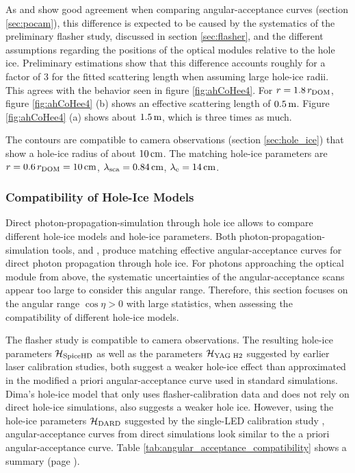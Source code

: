 As \clsim and \ppc show good agreement when comparing angular-acceptance
curves (section \ref{sec:pocam}), this difference is expected to be
caused by the systematics of the preliminary flasher study, discussed in
section \ref{sec:flasher}, and the different assumptions regarding the
positions of the optical modules relative to the hole ice. Preliminary
estimations show that this difference accounts roughly for a factor of
\(3\) for the fitted scattering length when assuming large hole-ice
radii. This agrees with the behavior seen in figure \ref{fig:ahCoHee4}.
For \(r=1.8\,r_\text{DOM}\), figure \ref{fig:ahCoHee4} (b) shows an effective
scattering length of \(0.5\text{\,m}\). Figure \ref{fig:ahCoHee4} (a) shows
about \(1.5\text{\,m}\), which is three times as much.

The  contours are compatible to camera observations
(section \ref{sec:hole_ice}) that show a hole-ice radius of about
\(10\text{\,cm}\). \cite{rongenswedishcamera} The matching 
hole-ice parameters are \(r = 0.6\,r_\text{DOM} = 10\text{\,cm}\),
\(\lambda_\text{sca} = 0.84\text{\,cm}\), \(\lambda_\text{e} = 14\text{\,cm}\).
\cite{martinspicehddard}

\subsubsection{Compatibility of Hole-Ice Models}
\label{sec:compatibility_of_hole_ice_parameters}

Direct photon-propagation-simulation through hole ice allows to compare
different hole-ice models and hole-ice parameters. Both
photon-propagation-simulation tools, \ppc and \clsim, produce matching
effective angular-acceptance curves for direct photon propagation
through hole ice. For photons approaching the optical module from above,
the systematic uncertainties of the \clsim angular-acceptance scans
appear too large to consider this angular range. Therefore, this section
focuses on the angular range \(\cos \eta > 0\) with large statistics,
when assessing the compatibility of different hole-ice models.

The  flasher study is compatible to camera observations.
The resulting hole-ice parameters \(\mathcal{H}_\text{SpiceHD}\) as well as the
parameters \(\mathcal{H}_\text{YAG H2}\) suggested by earlier laser calibration
studies, both suggest a weaker hole-ice effect than approximated in the
modified a priori angular-acceptance curve used in standard
\clsim simulations. Dima's hole-ice model that only uses
flasher-calibration data and does not rely on direct hole-ice
simulations, also suggests a weaker hole ice. However, using the
hole-ice parameters \(\mathcal{H}_\text{DARD}\) suggested by the single-LED
calibration study , angular-acceptance curves from direct
simulations look similar to the a priori angular-acceptance curve. Table
\ref{tab:angular_acceptance_compatibility} shows a summary (page
\pageref{tab:angular_acceptance_compatibility}).

